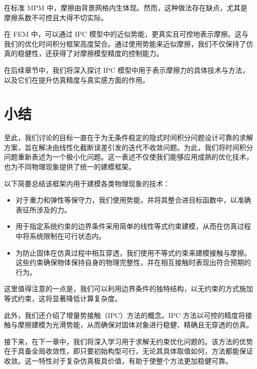 在标准 MPM 中，摩擦由背景网格内生体现。然而，这种做法存在缺点，尤其是摩擦系数不可控且大得不切实际。

在 FEM 中，可以通过 IPC 模型中的近似势能，更真实且可控地表示摩擦。这与我们的优化时间积分框架高度契合。通过使用势能来近似摩擦，我们不仅保持了仿真的稳健性，还获得了对摩擦模型精度的控制能力。

在后续章节中，我们将深入探讨 IPC 模型中用于表示摩擦力的具体技术与方法，以及它们在提升仿真精度与真实感方面的作用。

\section{小结}
\label{sec:ch02-summary}

至此，我们讨论的目标一直在于为无条件稳定的隐式时间积分问题设计可靠的求解方案，旨在解决由线性化截断误差引发的迭代不收敛问题。为此，我们将时间积分问题重新表述为一个极小化问题。这一表述不仅使我们能够应用成熟的优化技术，也为不同物理现象提供了统一的建模框架。

以下简要总结该框架内用于建模各类物理现象的技术：
\begin{itemize}
  \item 对于重力和弹性等保守力，我们使用势能，并将其整合进目标函数中，以准确表征所涉及的力。
  \item 用于指定系统约束的边界条件采用简单的线性等式约束建模，从而在仿真过程中将系统限制在可行状态内。
  \item 为防止固体在仿真过程中相互穿透，我们使用不等式约束来建模接触与摩擦。这些约束确保物体保持自身的物理完整性，并在相互接触时表现出符合预期的行为。
\end{itemize}

这里值得注意的一点是，我们可以利用边界条件的独特结构，以无约束的方式施加等式约束，这将显著降低计算复杂度。

此外，我们还介绍了增量势接触（IPC）方法的概念。IPC 方法以可控的精度将接触与摩擦建模为光滑势能，从而确保对固体对象进行稳健、精确且无穿透的仿真。

接下来，在下一章中，我们将深入学习用于求解无约束优化问题的。该方法的优势在于具备全局收敛性，即只要初始构型可行，无论其具体取值如何，方法都能保证收敛。这一特性对于复杂仿真极具价值，有助于使整个方法更加稳健可靠。
